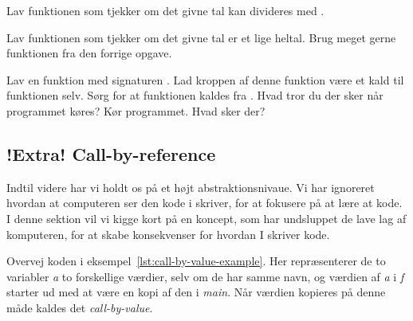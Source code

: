         \begin{exercise}
            Lav funktionen 
            som tjekker om det givne tal  kan
            divideres med .
        \end{exercise}

        \begin{exercise}
            Lav funktionen  som
            tjekker om det givne tal  er et lige
            heltal.  Brug meget gerne funktionen
             fra den forrige opgave.
        \end{exercise}

        \begin{exercise}
            Lav en funktion med signaturen . Lad
            kroppen af denne funktion være et kald til funktionen
            selv. Sørg for at funktionen kaldes fra .
            Hvad tror du der sker når programmet køres? Kør
            programmet. Hvad sker der?
        \end{exercise}

    \subsection{!Extra! Call-by-reference}



        Indtil videre har vi holdt os på et højt abstraktionsnivaue.
        Vi har ignoreret hvordan at computeren ser den kode i skriver,
        for at fokusere på at lære at kode. I denne sektion vil vi
        kigge kort på en koncept, som har undsluppet de lave lag af
        komputeren, for at skabe konsekvenser for hvordan I skriver
        kode.

        Overvej koden i eksempel~\ref{lst:call-by-value-example}. Her
        repræsenterer de to variabler \emph{a} to forskellige værdier,
        selv om de har samme navn, og værdien af \emph{a} i \emph{f}
        starter ud med at være en kopi af den i \emph{main}. Når
        værdien kopieres på denne måde kaldes det
        \emph{call-by-value}.

